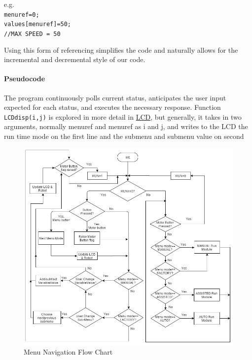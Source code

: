 \documentclass[MTRX3700report.tex]{subfiles}
\begin{document}
	e.g.\\
	\texttt{menu\textunderscore ref=0;\\values[menu\textunderscore ref]=50;\\//MAX SPEED = 50}
	
	Using this form of referencing simplifies the code and naturally allows for the incremental and decremental style of our code.
	
	\paragraph{Pseudocode}
		The program continuously polls current status, anticipates the user input expected for each status, and executes the necessary response. Function \texttt{LCD\textunderscore disp(i,j)} is explored in more detail in \underline{LCD}, but generally, it takes in two arguments, normally menu\textunderscore ref and menu\textunderscore ref as i and j, and writes to the LCD the run time mode on the first line and the submenu and submenu value on second\\
		
		
		
			\begin{figure}[h]
				\includegraphics[scale=0.45]{menu_navFlowChart.png}
				\centering
				\caption{Menu Navigation Flow Chart}
			\end{figure}
	
	
	

	
	
	
	
\end{document}
